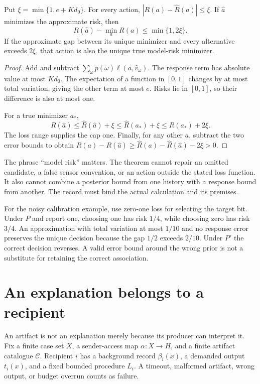 \begin{Coretheorem}\label{Core:r:risk}
Put $\xi=\min\{1,e+Kd_0\}$. For every action, $|R(a)-\widehat R(a)|\le\xi$. If $\widehat a$ minimizes the approximate risk, then
\[
R(\widehat a)-\min_a R(a)\le\min\{1,2\xi\}.
\]
If the approximate gap between its unique minimizer and every alternative exceeds $2\xi$, that action is also the unique true model-risk minimizer.
\end{Coretheorem}
\begin{proof}
Add and subtract $\sum_\omega p(\omega)\ell(a,\widehat v_\omega)$. The response term has absolute value at most $Kd_0$. The expectation of a function in $[0,1]$ changes by at most total variation, giving the other term at most $e$. Risks lie in $[0,1]$, so their difference is also at most one.

For a true minimizer $a_*$,
\[
R(\widehat a)\le\widehat R(\widehat a)+\xi
\le\widehat R(a_*)+\xi\le R(a_*)+2\xi.
\]
The loss range supplies the cap one. Finally, for any other $a$, subtract the two error bounds to obtain
$R(a)-R(\widehat a)\ge\widehat R(a)-\widehat R(\widehat a)-2\xi>0$.
\end{proof}

The phrase ``model risk'' matters. The theorem cannot repair an omitted candidate, a false sensor convention, or an action outside the stated loss function. It also cannot combine a posterior bound from one history with a response bound from another. The record must bind the actual calculation and its premises.

For the noisy calibration example, use zero-one loss for selecting the target bit. Under $P$ and report one, choosing one has risk $1/4$, while choosing zero has risk $3/4$. An approximation with total variation at most $1/10$ and no response error preserves the unique decision because the gap $1/2$ exceeds $2/10$. Under $P'$ the correct decision reverses. A valid error bound around the wrong prior is not a substitute for retaining the correct association.

\section{An explanation belongs to a recipient}
An artifact is not an explanation merely because its producer can interpret it. Fix a finite case set $X$, a sender-access map $\alpha:X\to H$, and a finite artifact catalogue $\mathcal C$. Recipient $i$ has a background record $\beta_i(x)$, a demanded output $t_i(x)$, and a fixed bounded procedure $L_i$. A timeout, malformed artifact, wrong output, or budget overrun counts as failure.

